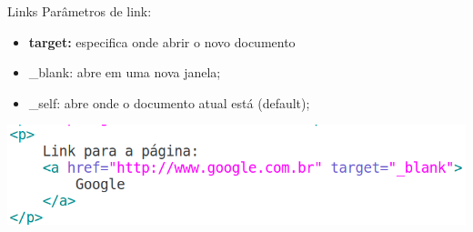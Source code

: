 \documentclass{beamer}
\begin{document}
\begin{frame}{Links}
  Parâmetros de link:
     \begin{itemize}
      \item \textbf{target:} especifica onde abrir o novo documento
       \item \_blank: abre em uma nova janela;
       \item \_self: abre onde o documento atual está (default); 
     \end{itemize}
     
     \includegraphics[height=0.25\paperheight]{fig/aula2/html7.png}
\end{frame}
\end{document}
